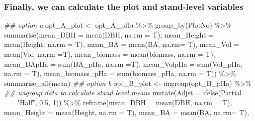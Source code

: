 \documentclass[
  letterpaper,
]{book}
\newenvironment{Shaded}{\begin{snugshade}}{\end{snugshade}}
\newcommand{\AttributeTok}[1]{\textcolor[rgb]{0.40,0.45,0.13}{#1}}
\newcommand{\DecValTok}[1]{\textcolor[rgb]{0.68,0.00,0.00}{#1}}
\newcommand{\DocumentationTok}[1]{\textcolor[rgb]{0.37,0.37,0.37}{\textit{#1}}}
\newcommand{\FloatTok}[1]{\textcolor[rgb]{0.68,0.00,0.00}{#1}}
\newcommand{\FunctionTok}[1]{\textcolor[rgb]{0.28,0.35,0.67}{#1}}
\newcommand{\NormalTok}[1]{\textcolor[rgb]{0.00,0.23,0.31}{#1}}
\newcommand{\OtherTok}[1]{\textcolor[rgb]{0.00,0.23,0.31}{#1}}
\newcommand{\SpecialCharTok}[1]{\textcolor[rgb]{0.37,0.37,0.37}{#1}}
\newcommand{\StringTok}[1]{\textcolor[rgb]{0.13,0.47,0.30}{#1}}
\begin{document}
\hypertarget{finally-we-can-calculate-the-plot-and-stand-level-variables}{%
\subsubsection{Finally, we can calculate the plot and stand-level
variables}\label{finally-we-can-calculate-the-plot-and-stand-level-variables}}

\begin{Shaded}
\begin{Highlighting}[]
\DocumentationTok{\#\# option a}
\NormalTok{opt\_A\_plot }\OtherTok{\textless{}{-}}\NormalTok{ opt\_A\_pHa }\SpecialCharTok{\%\textgreater{}\%} 
  \FunctionTok{group\_by}\NormalTok{(PlotNo) }\SpecialCharTok{\%\textgreater{}\%} 
  \FunctionTok{summarise}\NormalTok{(}\AttributeTok{mean\_DBH =} \FunctionTok{mean}\NormalTok{(DBH, }\AttributeTok{na.rm =}\NormalTok{ T), }
            \AttributeTok{mean\_Height =} \FunctionTok{mean}\NormalTok{(Height, }\AttributeTok{na.rm =}\NormalTok{ T), }
            \AttributeTok{mean\_BA =} \FunctionTok{mean}\NormalTok{(BA, }\AttributeTok{na.rm=}\NormalTok{ T), }
            \AttributeTok{mean\_Vol =} \FunctionTok{mean}\NormalTok{(Vol, }\AttributeTok{na.rm =}\NormalTok{T), }
            \AttributeTok{mean\_biomass =} \FunctionTok{mean}\NormalTok{(biomass, }\AttributeTok{na.rm =}\NormalTok{ T),}
            \AttributeTok{mean\_BApHa =} \FunctionTok{sum}\NormalTok{(BA\_pHa, }\AttributeTok{na.rm =}\NormalTok{T), }
            \AttributeTok{mean\_VolpHa =} \FunctionTok{sum}\NormalTok{(Vol\_pHa, }\AttributeTok{na.rm =}\NormalTok{ T),}
            \AttributeTok{mean\_biomass\_pHa =} \FunctionTok{sum}\NormalTok{(biomass\_pHa, }\AttributeTok{na.rm =}\NormalTok{ T)) }\SpecialCharTok{\%\textgreater{}\%} 
  \FunctionTok{summarise\_all}\NormalTok{(mean)}
\DocumentationTok{\#\# option b}
\NormalTok{opt\_B\_plot }\OtherTok{\textless{}{-}} \FunctionTok{ungroup}\NormalTok{(opt\_B\_pHa) }\SpecialCharTok{\%\textgreater{}\%} \DocumentationTok{\#\# ungroup data to calculate stand level means }
  \FunctionTok{mutate}\NormalTok{(}\AttributeTok{Adjst =} \FunctionTok{ifelse}\NormalTok{(Partial }\SpecialCharTok{==} \StringTok{"Half"}\NormalTok{, }\FloatTok{0.5}\NormalTok{, }\DecValTok{1}\NormalTok{)) }\SpecialCharTok{\%\textgreater{}\%}
  \FunctionTok{reframe}\NormalTok{(}\AttributeTok{mean\_DBH =} \FunctionTok{mean}\NormalTok{(DBH, }\AttributeTok{na.rm =}\NormalTok{ T), }
            \AttributeTok{mean\_Height =} \FunctionTok{mean}\NormalTok{(Height, }\AttributeTok{na.rm =}\NormalTok{ T), }
            \AttributeTok{mean\_BA =} \FunctionTok{mean}\NormalTok{(BA, }\AttributeTok{na.rm=}\NormalTok{ T), }

\end{Highlighting}
\end{Shaded}
\end{document}
